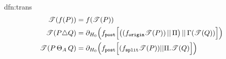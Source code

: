 \documentclass[../hons_project.tex]{subfiles}
\begin{document}
\begin{dfn}{dfn:trans}{}
\begin{align*}
		\mathscr{T}(f(P))           & = f(\mathscr{T}(P))                                                                                                                                                                               \\
		\mathscr{T}(P \triangle Q) & = \partial_{H_{0}}\Bigl(f_{\mathtt{post}}\Bigl[ \bigl((f_{\mathtt{origin}}\mathscr{T}(P)) \,\vert\vert\, \Pi\bigr) \,\vert\vert\, \Gamma(\mathscr{T}(Q)) \Bigr]\Bigr)                                                              \\
		\mathscr{T}(P \,\Theta_{A}\, Q)     & = \partial_{H_{0}}\Bigl(f_{\mathtt{post}} \Bigl[ (f_{\mathtt{split}} \mathscr{T}(P)) | | \Pi.\mathscr{T}(Q) \Bigr]\Bigr)
	\end{align*}
\end{dfn}
\end{document}
